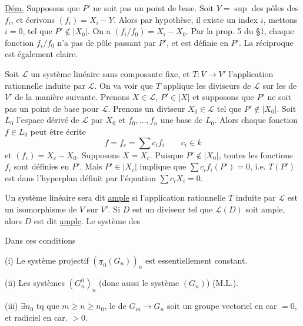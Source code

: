 \uline{Dém.} Supposons que $P'$ ne soit pas un point de base. Soit $Y=\sup$ des pôles des $f_i$, et écrivons $(f_i)=X_i-Y$. Alors par hypothèse, il existe un index $i$, mettons $i=0$, tel que $P'\notin|X_0|$. On a $(f_i/f_0)=X_i-X_0$. Par la prop. 5 du \S 1, chaque fonction $f_i/f_0$ n'a pas de pôle passant par $P'$, et est définie en $P'$. La réciproque est également claire.

Soit $\mathcal{L}$ un système linéaire sans composante fixe, et $T:V\longrightarrow V'$ l'application rationnelle induite par $\mathcal{L}$. On va voir que $T$ applique les diviseurs de $\mathcal{L}$ sur les   de $V'$ de la manière suivante. Prenons $X\in\mathcal{L}$, $P'\in|X|$ et supposons que $P'$ ne soit pas un point de base pour $\mathcal{L}$. Prenons un diviseur $X_0\in\mathcal{L}$ tel que $P'\notin|X_0|$. Soit $L_0$ l'espace dérivé de $\mathcal{L}$ par $X_0$ et $f_0,\ldots,f_n$ une base de $L_0$. Alors chaque fonction $f\in L_0$ peut être écrite
\[
f=f_c=\sum c_i f_i\qquad c_i\in k
\]
et $(f_c)=X_c-X_0$. Supposons $X=X_c$. Puisque $P'\notin|X_0|$, toutes les fonctions $f_i$ sont définies en $P'$. Mais $P'\in|X_c|$ implique que $\sum c_i f_i(P')=0$, i.e. $T(P')$ est dans l'hyperplan définit par l'équation $\sum c_i X_i=0$.

Un système linéaire sera dit \uline{ample}  si l'application rationnelle $T$ induite par $\mathcal{L}$ est un isomorphisme de $V$ sur $V'$. Si $D$ est un diviseur tel que $\mathcal{L}(D)$ soit ample, alors $D$ est dit \uline{ample}. Le système des



Dans ces conditions

(i) Le système projectif $(\underline{\pi}_0(G_n))_n$ est essentiellement constant.

(ii) Les systèmes $(G_n^0)_n$ (donc aussi le système $(G_n)$)  (M.L.).

(iii)   $\exists n_0$ tq  que  $m\geq n\geq n_0$, le  de $G_m\longrightarrow G_n$ soit un groupe vectoriel  en car $=0$, et  radiciel en car. $>0$.


